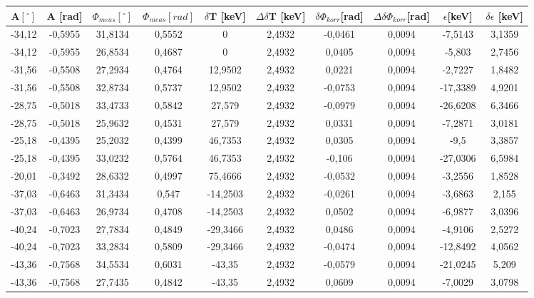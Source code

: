 \documentclass[ngerman]{scrartcl} %
\begin{document}
\begin{table}
	
	\begin{tabular}{c|c| c|c|c|c |c |c|c|c}
		A$ [^{\circ}]$&A [rad]&$\Phi_{meas} [^{\circ}]$& $\Phi_{meas} [rad]$      &$\delta$T [keV]         & $\Delta \delta$T [keV]      &$\delta \Phi_{korr}$[rad]         & $\Delta \delta \Phi_{korr}$[rad]       & $\epsilon$[keV]        & $\delta \epsilon $ [keV]     \\ \hline
-34,12 & -0,5955 & 31,8134 & 0,5552 & 0 & 2,4932 & -0,0461 & 0,0094 & -7,5143 & 3,1359 \\ \hline
-34,12 & -0,5955 & 26,8534 & 0,4687 & 0 & 2,4932 & 0,0405 & 0,0094 & -5,803 & 2,7456 \\ \hline
-31,56 & -0,5508 & 27,2934 & 0,4764 & 12,9502 & 2,4932 & 0,0221 & 0,0094 & -2,7227 & 1,8482 \\ \hline
-31,56 & -0,5508 & 32,8734 & 0,5737 & 12,9502 & 2,4932 & -0,0753 & 0,0094 & -17,3389 & 4,9201 \\ \hline
-28,75 & -0,5018 & 33,4733 & 0,5842 & 27,579 & 2,4932 & -0,0979 & 0,0094 & -26,6208 & 6,3466 \\ \hline
-28,75 & -0,5018 & 25,9632 & 0,4531 & 27,579 & 2,4932 & 0,0331 & 0,0094 & -7,2871 & 3,0181 \\ \hline
-25,18 & -0,4395 & 25,2032 & 0,4399 & 46,7353 & 2,4932 & 0,0305 & 0,0094 & -9,5 & 3,3857 \\ \hline
-25,18 & -0,4395 & 33,0232 & 0,5764 & 46,7353 & 2,4932 & -0,106 & 0,0094 & -27,0306 & 6,5984 \\ \hline
-20,01 & -0,3492 & 28,6332 & 0,4997 & 75,4666 & 2,4932 & -0,0532 & 0,0094 & -3,2556 & 1,8528 \\ \hline
-37,03 & -0,6463 & 31,3434 & 0,547 & -14,2503 & 2,4932 & -0,0261 & 0,0094 & -3,6863 & 2,155 \\ \hline
-37,03 & -0,6463 & 26,9734 & 0,4708 & -14,2503 & 2,4932 & 0,0502 & 0,0094 & -6,9877 & 3,0396 \\ \hline
-40,24 & -0,7023 & 27,7834 & 0,4849 & -29,3466 & 2,4932 & 0,0486 & 0,0094 & -4,9106 & 2,5272 \\ \hline
-40,24 & -0,7023 & 33,2834 & 0,5809 & -29,3466 & 2,4932 & -0,0474 & 0,0094 & -12,8492 & 4,0562 \\ \hline
-43,36 & -0,7568 & 34,5534 & 0,6031 & -43,35 & 2,4932 & -0,0579 & 0,0094 & -21,0245 & 5,209 \\ \hline
-43,36 & -0,7568 & 27,7435 & 0,4842 & -43,35 & 2,4932 & 0,0609 & 0,0094 & -7,0029 & 3,0798 \\ \hline

\end{tabular}
\end{table}
\end{document}
